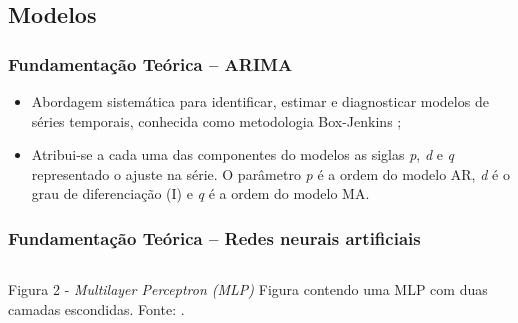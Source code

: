 \documentclass[aspectratio=169]{beamer}
\begin{document}
\subsection{Modelos}

\begin{frame}[fragile] 
    \frametitle{Fundamentação Teórica -- ARIMA}
    \begin{itemize}
		\item Abordagem sistemática para identificar, estimar e diagnosticar modelos de séries temporais, conhecida como metodologia Box-Jenkins \cite{Arima};
		\item Atribui-se a cada uma das componentes do modelos as siglas \textit{p}, \textit{d} e \textit{q} representado o ajuste na série. O parâmetro \textit{p} é a ordem do modelo AR, \textit{d} é o grau de diferenciação (I) e \textit{q} é a ordem do modelo MA.
	\end{itemize}
\end{frame}

\begin{frame}[fragile] 
    \frametitle{Fundamentação Teórica -- Redes neurais artificiais}
    \begin{columns}[c]
		\begin{column}{1\linewidth}
			\begin{figure}
				\label{fig:mlp}
			\end{figure}

			\begin{block}{ Figura 2 - \textit{Multilayer Perceptron (MLP)}}
				Figura contendo uma MLP com duas camadas escondidas. \newline Fonte: \cite{multilayer}.    
			\end{block}
		\end{column}
	\end{columns}
\end{frame}
\end{document}
